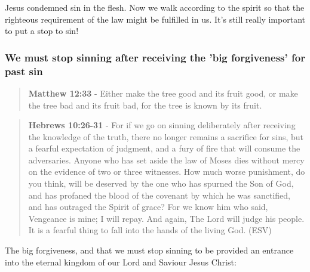 \documentclass[11pt]{article}
\begin{document}
Jesus condemned sin in the flesh. Now we walk according to the spirit so that the righteous requirement of the law might be fulfilled in us.
It's still really important to put a stop to sin!

\subsubsection{We must stop sinning after receiving the 'big forgiveness' for past sin}
\label{sec:org21933f4}
\begin{quote}
\textbf{Matthew 12:33} - Either make the tree good and its fruit good, or make the tree bad and its fruit bad, for the tree is known by its fruit.
\end{quote}

\begin{quote}
\textbf{Hebrews 10:26-31} - For if we go on sinning deliberately after receiving the knowledge of the truth, there no longer remains a sacrifice for sins, but a fearful expectation of judgment, and a fury of fire that will consume the adversaries. Anyone who has set aside the law of Moses dies without mercy on the evidence of two or three witnesses. How much worse punishment, do you think, will be deserved by the one who has spurned the Son of God, and has profaned the blood of the covenant by which he was sanctified, and has outraged the Spirit of grace? For we know him who said, Vengeance is mine; I will repay. And again, The Lord will judge his people. It is a fearful thing to fall into the hands of the living God. (ESV)
\end{quote}

The big forgiveness, and that we must stop sinning to be provided an entrance into the eternal kingdom of our Lord and Saviour Jesus Christ:
\end{document}
